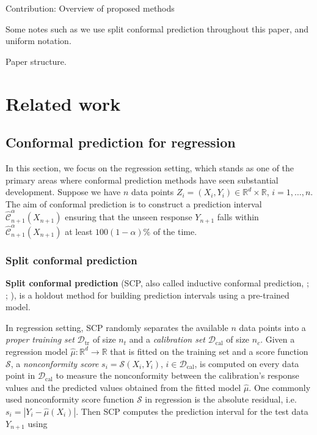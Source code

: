 \documentclass[
  11pt,
  a4paper,
]{article}
\theoremstyle{plain}
\theoremstyle{plain}
\theoremstyle{remark}
\begin{document}
Contribution: Overview of proposed methods

Some notes such as we use split conformal prediction throughout this
paper, and uniform notation.

Paper structure.

\section{Related work}\label{sec-review}

\subsection{Conformal prediction for regression}\label{sec-review_reg}

In this section, we focus on the regression setting, which stands as one
of the primary areas where conformal prediction methods have seen
substantial development. Suppose we have \(n\) data points
\(Z_i = (X_i, Y_i) \in \mathbb{R}^d \times \mathbb{R}\),
\(i=1,\ldots,n\). The aim of conformal prediction is to construct a
prediction interval
\(\hat{\mathcal{C}}_{n+1}^{\alpha}\left(X_{n+1}\right)\) ensuring that
the unseen response \(Y_{n+1}\) falls within
\(\hat{\mathcal{C}}_{n+1}^{\alpha}\left(X_{n+1}\right)\) at least
\(100(1-\alpha)\%\) of the time.

\subsubsection{Split conformal
prediction}\label{split-conformal-prediction}

\textbf{Split conformal prediction} (SCP, also called inductive
conformal prediction, \textcite{papadopoulos2002}; \textcite{vovk2005};
\textcite{lei2018}), is a holdout method for building prediction
intervals using a pre-trained model.

In regression setting, SCP randomly separates the available \(n\) data
points into a \emph{proper training set} \(\mathcal{D}_{\text{tr}}\) of
size \(n_t\) and a \emph{calibration set} \(\mathcal{D}_{\text{cal}}\)
of size \(n_c\). Given a regression model
\(\hat{\mu}: \mathbb{R}^d \rightarrow \mathbb{R}\) that is fitted on the
training set and a score function \(\mathcal{S}\), a \emph{nonconformity
score} \(s_i = \mathcal{S}\left(X_i, Y_i\right)\),
\(i\in\mathcal{D}_{\text{cal}}\), is computed on every data point in
\(\mathcal{D}_{\text{cal}}\) to measure the nonconformity between the
calibration's response values and the predicted values obtained from the
fitted model \(\hat{\mu}\). One commonly used nonconformity score
function \(\mathcal{S}\) in regression is the absolute residual,
i.e.~\(s_i = |Y_i - \hat{\mu}(X_i)|\). Then SCP computes the prediction
interval for the test data \(Y_{n+1}\) using
\end{document}
